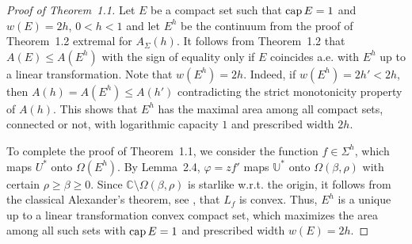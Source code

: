 \documentclass[11pt]{pjm}
\newcommand{\pf}{\begin{proof}}
\newcommand{\epf}{\end{proof}}
\newcommand{\CAP}{{\rm cap}\,}
\newcommand{\C}{{\mathbb{C}}}
\newcommand{\U}{{\mathbb{U}}}
\begin{document}
\medskip

\pf[Proof of Theorem~1.1] 
Let $E$ be a compact set such that $\CAP E=1$ and $w(E)=2h$, $0< h<1$ and let $E^h$ be the continuum from the proof of Theorem~1.2
extremal for $A_\Sigma(h)$.
It follows from Theorem~1.2 that $A(E)\le A(E^h)$ with the sign of equality only if $E$ coincides a.e. with $E^h$
up to a linear transformation. Note that $w(E^h)=2h$. Indeed, if $w(E^h)=2h'<2h$, then $A(h)=A(E^h)\le A(h')$ contradicting the strict
monotonicity property of $A(h)$. This shows that $E^h$ has the maximal area among all compact sets, connected or not, 
with logarithmic capacity
$1$ and prescribed width $2h$. 

To complete the proof of Theorem~1.1, we consider the function $f\in \Sigma^h$, which maps $U^*$ onto $\Omega(E^h)$.
By Lemma~2.4, $\varphi=zf'$ maps $\U^*$ onto $\Omega(\beta,\rho)$ with certain $\rho\ge \beta \ge 0$. Since $\C\setminus \Omega(\beta,\rho)$
is starlike w.r.t. the origin, it follows from the classical Alexander's theorem, see \cite[p.43]{Du}, that $L_f$ is convex. Thus, $E^h$ is a unique
up to a linear transformation convex compact set, which maximizes the area among all such sets with $\CAP E=1$ and prescribed width 
$w(E)=2h$.
\epf
\end{document}
